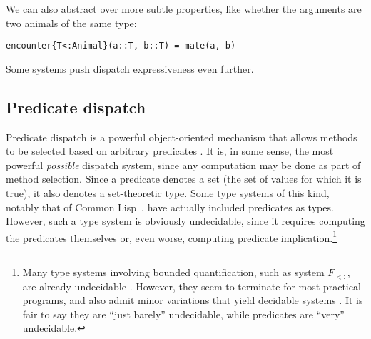 \noindent
We can also abstract over more subtle properties, like whether the
arguments are two animals of the same type:

\begin{verbatim}
encounter{T<:Animal}(a::T, b::T) = mate(a, b)
\end{verbatim}

\noindent
Some systems push dispatch expressiveness even further.


\subsection{Predicate dispatch}


Predicate dispatch is a powerful object-oriented mechanism that allows
methods to be selected based on arbitrary predicates \cite{ErnstKC98}.
It is, in some sense, the most powerful \emph{possible} dispatch system,
since any computation may be done as part of method selection.
Since a predicate denotes a set (the set of values for which it is true),
it also denotes a set-theoretic type.
Some type systems of this kind, notably that of Common
Lisp~\cite{steele1990common:types}, have actually included predicates as types.
However, such a type system is obviously undecidable, since it
requires computing the predicates themselves or, even worse, computing
predicate implication.\footnote{
Many type systems involving bounded quantification, such as system $F_{<:}$,
are already undecidable \cite{Pierce1994131}.
However, they seem to terminate for most practical programs, and also admit
minor variations that yield decidable systems \cite{Castagna:1994:DBQ:174675.177844}.
It is fair to say they are ``just barely'' undecidable, while predicates
are ``very'' undecidable.
}

